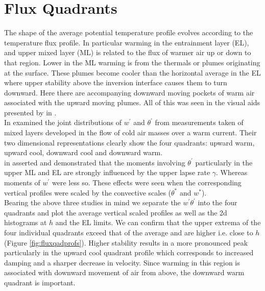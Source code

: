 
\section{Flux Quadrants}
\label{sec:fluxquadrants}     
\FloatBarrier

The shape of the average potential temperature profile evolves according to the temperature flux
profile. In particular warming in the entrainment layer (\acs{EL}), and upper mixed layer (\acs{ML})
is related to the flux of warmer air up or down to that region.  Lower in the \acs{ML} warming is 
from the thermals or plumes originating at the surface.  These plumes become cooler than the horizontal
average in the \acs{EL} where upper stability above the inversion interface causes them to turn downward.
Here there are accompanying downward moving pockets of warm air associated with the upward moving
plumes.  All of this was seen in the visual aids presented by \citeauthor{SullMoengStev} in \cite{SullMoengStev}.\\

In \cite{MahrtPaum} \citeauthor{MahrtPaum} examined the joint distributions of $w^{'}$ and $\theta^{'}$ 
from measurements taken of mixed layers developed in the flow of cold air masses over a warm current.
Their two dimensional representations clearly show the four quadrants: upward warm, upward cool, downward cool
and downward warm.\\

\citeauthor{Sorbjan} in \cite{Sorbjan} asserted and demonstrated that the moments involving $\theta^{'}$
particularly in the upper \acs{ML} and \acs{EL} are strongly influenced by the upper lapse rate $\gamma$.
Whereas moments of $w^{'}$ were less so.  These effects were seen when the corresponding vertical profiles
were scaled by the convective scales ($\theta^{*}$ and $w^{*}$).\\

Bearing the above three studies in mind we separate the $w^{'}\theta^{'}$ into the four quadrants and plot
the average vertical scaled profiles as well as the 2d histograms at $h$ and the \acs{EL} limits.  We
can confirm that the upper extrema of the four individual quadrants exceed that of the average
and are higher i.e. close to $h$ (Figure \ref{fig:fluxqadprofs}).  Higher stability results in a more pronounced peak particularly in the
upward cool quadrant profile which corresponds to increased damping and a sharper decrease in velocity.
Since warming in this region is associated with downward movement of air from above, the downward warm
quadrant is important.\\

